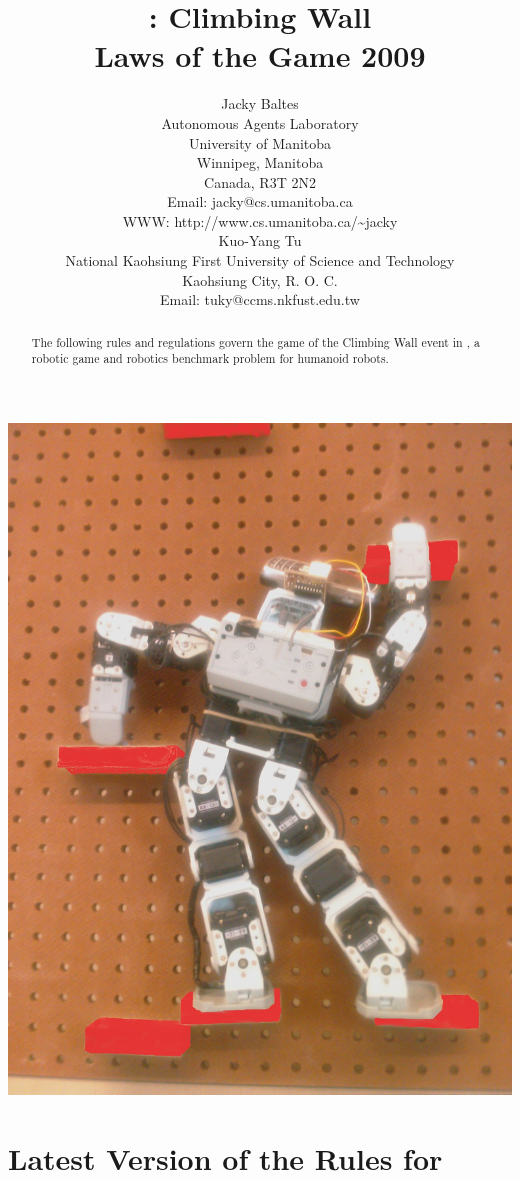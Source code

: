 \documentclass[12pt]{hurocup}
\begin{document}
\title{\HuroCup: Climbing Wall\\
  Laws of the Game 2009}

\author{Jacky Baltes\\
Autonomous Agents Laboratory\\
University of Manitoba\\
Winnipeg, Manitoba\\
Canada, R3T 2N2\\
Email: jacky@cs.umanitoba.ca\\
WWW: http://www.cs.umanitoba.ca/\~{ }jacky\\[5mm]
Kuo-Yang Tu\\
National Kaohsiung First University of Science and Technology\\
Kaohsiung City, R. O. C.\\
Email: tuky@ccms.nkfust.edu.tw\\
}

\maketitle

\begin{center}
 \includegraphics[width=0.4\linewidth]{Figures/climbing-wall}
\end{center}

\begin{abstract}
The following rules and regulations govern the game of the Climbing
Wall event in \HuroCup, a robotic game and robotics benchmark problem
for humanoid robots.
%
\end{abstract}

\section*{Latest Version of the Rules for \HuroCup}
\label{sec:updates}
\end{document}
